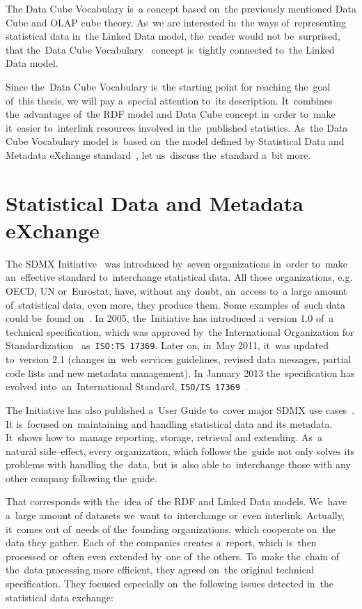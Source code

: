 The Data Cube Vocabulary is~a concept based on~the previously mentioned Data Cube and
OLAP cube theory. As~we are interested in~the ways of~representing statistical data in~the
Linked Data model, the~reader would not be~surprised, that the~Data Cube 
Vocabulary~\cite{dcv}
concept is~tightly connected to~the Linked Data model.

Since the~Data Cube Vocabulary is~the starting point for reaching the~goal of~this thesis,
we will pay a~special attention to~its description. It~combines the~advantages of~the RDF
model and Data Cube concept in~order to~make it~easier to~interlink resources involved
in the~published statistics. As~the Data Cube Vocabulary model is~based on~the model defined
by Statistical Data and Metadata eXchange standard~\cite{sdmx}, let us~discuss the~standard a~bit more.

\section{Statistical Data and Metadata eXchange}
The SDMX Initiative~\cite{sdmx} was introduced by~seven organizations in~order to~make
an~effective standard to~interchange statistical data. All those organizations, e.g. OECD,
UN or~Eurostat, have, without any doubt, an~access to~a large amount of~statistical data, even more,
they produce them. Some examples of~such data could be~found on~\cite{pubdata}.
In 2005, the~Initiative has introduced a
version 1.0 of~a technical specification, which was approved by~the International
Organization for Standardization~\cite{iso} as~\texttt{ISO:TS 17369}.
Later on, in~May 2011, it~was updated to~version 2.1 (changes in~web services guidelines,
revised data messages, partial code lists and new metadata management).
In January 2013 the~specification has evolved into~an~International Standard,
\texttt{ISO/IS 17369}~\cite{isosdmx}.

The Initiative has also published a~User Guide to~cover major SDMX use cases~\cite{sdmxuserguide}.
It is~focused on~maintaining and handling statistical data and its metadata. It~shows
how to~manage reporting, storage, retrieval and extending. As~a natural side--effect,
every organization, which follows the~guide not only solves its problems with
handling the~data, but is~also able to~interchange those with any other company
following the~guide.

That corresponds with the~idea of~the RDF and Linked Data models. We~have a~large amount
of datasets we~want to~interchange or~even interlink. Actually, it~comes out of~needs
of the~founding organizations, which cooperate on~the data they gather. Each of~the companies creates
a~report, which is~then processed or~often even extended by~one of~the others. To~make the~chain
of the~data processing more efficient, they agreed on~the original technical specification.
They focused especially on~the following issues detected in~the statistical data exchange:

